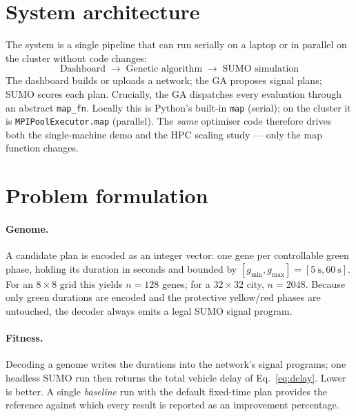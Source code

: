 \documentclass[11pt,a4paper]{article}
\begin{document}
\section{System architecture}
The system is a single pipeline that can run serially on a laptop or in
parallel on the cluster without code changes:
\[
\boxed{\text{Dashboard}} \;\rightarrow\;
\boxed{\text{Genetic algorithm}} \;\rightarrow\;
\boxed{\text{SUMO simulation}}
\]
The dashboard builds or uploads a network; the GA proposes signal plans; SUMO
scores each plan. Crucially, the GA dispatches every evaluation through an
abstract \texttt{map\_fn}. Locally this is Python's built-in \texttt{map}
(serial); on the cluster it is \texttt{MPIPoolExecutor.map} (parallel). The
\emph{same} optimiser code therefore drives both the single-machine demo and the
HPC scaling study --- only the map function changes.

\section{Problem formulation}
\paragraph{Genome.} A candidate plan is encoded as an integer vector: one gene
per controllable green phase, holding its duration in seconds and bounded by
$[g_{\min},g_{\max}]=[\SI{5}{\second},\SI{60}{\second}]$. For an $8\times8$ grid
this yields $n=128$ genes; for a $32\times32$ city, $n=2048$. Because only green
durations are encoded and the protective yellow/red phases are untouched, the
decoder always emits a legal SUMO signal program.

\paragraph{Fitness.} Decoding a genome writes the durations into the network's
signal programs; one headless SUMO run then returns the total vehicle delay of
Eq.~\eqref{eq:delay}. Lower is better. A single \emph{baseline} run with the
default fixed-time plan provides the reference against which every result is
reported as an improvement percentage.

\end{document}
